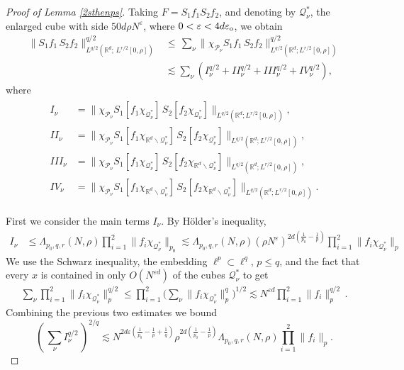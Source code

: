 \documentclass[11pt]{amsart}
\theoremstyle{definition}
\numberwithin{theorem}{section}
\numberwithin{definition}{section}
\numberwithin{equation}{section}
\def\nuv{\nu}
\newcommand{\Be}{\begin{equation}}
\newcommand{\Ee}{\end{equation}}
\newcommand{\e}{\varepsilon}
\renewcommand{\le}{\leqslant}
\def\lc{\lesssim}
\def\eps{\varepsilon}
\def\cP{{\mathcal {P}}}
\def\cQ{{\mathcal {Q}}}
\def\e{\varepsilon}
\renewcommand{\le}{\leqslant}
\begin{document}
\begin{proof}[Proof of Lemma \ref{2sthenps}]
Taking $F= S_1f_1S_2f_2$, and
denoting by
$\mathcal{Q}_\nuv^*$, the enlarged cube with side
$50d\rho N^\e$, where $0<\eps<4d\eps_{\rm{o}}$, we obtain
\begin{align*}
\big\|
S_1f_1\,S_2f_2
\big\|^{q/2}_{L^{q/2}(\mathbb{R}^d;\,L^{r/2}[0,\rho])}&
\le\,
\sum_{\nuv} \|\chi_{\cP_\nuv}S_1f_1\,S_2f_2\|_{L^{q/2}(\mathbb
R^d;L^{r/2}[0,\rho])}^{q/2}\\&\lc
\sum_{\nuv}(I_\nuv^{q/2}+II_\nuv^{q/2}+III_\nuv^{q/2}+IV_\nuv^{q/2}),
\end{align*}
where
\begin{align}\label{fs}\begin{split}
I_{\nuv}&=
\big\|\chi_{\cP_\nuv}S_1[f_1\chi_{\mathcal{Q}_\nuv^*}]\,S_2[f_2\chi_{\mathcal{Q}_\nuv^*}]
\big\|_{L^{q/2}(\mathbb R^d;L^{r/2}[0,\rho])},
\\
 I\!I_\nuv&=
\big\|\chi_{\cP_\nuv}
S_1[f_1\chi_{\mathbb{R}^d\backslash\mathcal{Q}_\nuv^*}]\,S_2[f_2\chi_{\mathcal{Q}_\nuv^*}]
\big\|_{L^{q/2}(\mathbb R^d;L^{r/2}[0,\rho])},
\\
I\!I\!I_\nuv&=
\big\|\chi_{\cP_\nuv}S_1[f_1\chi_{\mathcal{Q}_\nuv^*}]\,S_2[f_2\chi_{\mathbb{R}^d\backslash\mathcal{Q}_\nuv^*}]
\big\|_{L^{q/2}(\mathbb R^d;L^{r/2}[0,\rho])},
\\
IV_\nuv&= \big\|\chi_{\cP_\nuv}
S_1[f_1\chi_{\mathbb{R}^d\backslash\mathcal{Q}_\nuv^*}]\,S_2[f_2\chi_{\mathbb{R}^d\backslash\mathcal{Q}_\nuv^*}]
\big\|_{L^{q/2}(\mathbb R^d;L^{r/2}[0,\rho])}.
\end{split}
\end{align}


First we consider the main terms $I_\nu$. By
H\"older's inequality,
\begin{align*}
I_\nuv &\le \Lambda_{p_0,q,r}(N,\rho)
\prod_{i=1}^2\|f_i\chi_{\mathcal{Q}_\nuv^*}\|_{p_0}
\lc \Lambda_{p_0,q,r}(N,\rho) (\rho N^\eps)^{2 d(\frac 1{p_0}-\frac 1p)}
\prod_{i=1}^2\|f_i\chi_{\mathcal{Q}_\nuv^*}\|_{p}
\end{align*}
We use  the Schwarz inequality, the embedding $\ell^p\subset \ell^q$, $p\le q$,
 and the fact that every $x$ is contained in only $O(N^{\eps d})$ of the cubes $\cQ_\nuv^*$ to get
\begin{align*}
\sum_\nuv\prod_{i=1}^2\|f_i\chi_{\mathcal{Q}_\nuv^*}\|_{p}^{q/2}
\le
\prod_{i=1}^2
\Big(\sum_\nuv\|f_i\chi_{\mathcal{Q}_\nuv^*}\|^{q}_{p}\Big)^{1/2}
\lc N^{\eps d}
\prod_{i=1}^2\|f_i\|_p^{q/2}\,.
\end{align*}
Combining the previous two estimates we bound
\Be\label{Inubound}(\,\sum_\nuv I_\nuv^{q/2}\,)^{2/q}\lc  N^{2d \eps(\frac{1}{p_0}-\frac 1p+\frac 1q)}
 \rho^{2d(\frac{1}{p_0}-\frac 1p)}
\Lambda_{p_0,q,r}(N,\rho)
\prod_{i=1}^2\|f_i\|_p.\Ee


\end{proof}
\end{document}
